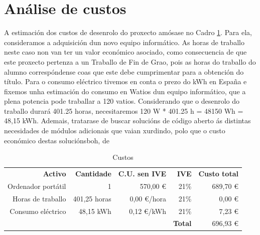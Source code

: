 \section{Análise de custos}

A estimación dos custos de desenrolo do proxecto amósase no Cadro \ref{tab:custosLabel}. Para ela, consideramos a adquisición dun novo equipo informático. As horas de traballo neste caso non van ter un valor económico asociado, como consecuencia de que este proxecto pertenza a un Traballo de Fin de Grao, pois as horas do traballo do alumno correspóndense coas que este debe cumprimentar para a obtención do título. Para o consumo eléctrico tivemos en conta o prezo do kWh en España\cite{preciokWh_espana} e fixemos unha estimación\cite{energyusecalculator} do consumo en Watios dun equipo informático, que a plena potencia pode traballar a 120 vatios. Considerando que o desenrolo  do traballo durará 401.25 horas, necesitaremos 120 W * 401.25 h = 48150 Wh = 48,15 kWh. Ademais, tratarase de buscar solucións de código aberto ás distintas necesidades de módulos adicionais que vaian xurdindo, polo que o custo económico destas soluciónsboh, de
\begin{table}[htbp]
  \centering
    \begin{tabular}{rrrrr}
    \textbf{Activo} & \textbf{Cantidade} & \textbf{C.U. sen IVE} & \textbf{IVE} & \textbf{Custo total} \\
    Ordenador portátil & 1     & 570,00 \euro & 21\%  & 689,70 \euro \\
    Horas de traballo & 401,25 horas & 0,00 \euro/hora & 21\%  & 0,00 \euro \\
    Consumo eléctrico & 48,15 kWh & 0,12 \euro/kWh & 21\%  & 7,23 \euro \\
          &       &       & \textbf{Total} & 696,93 \euro \\
    \end{tabular}%
		\caption{Custos}
  \label{tab:custosLabel}%
\end{table}%


